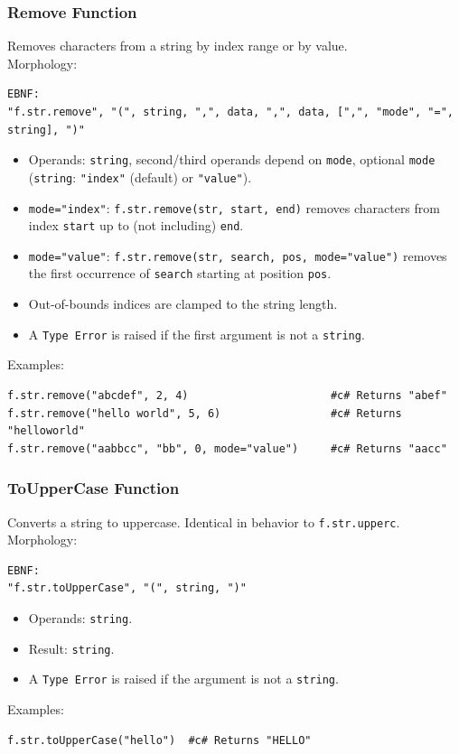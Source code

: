 \subsubsection{Remove Function}
Removes characters from a string by index range or by value. \\
Morphology:
\begin{verbatim}
EBNF:
"f.str.remove", "(", string, ",", data, ",", data, [",", "mode", "=", string], ")"
\end{verbatim}
\begin{itemize}
\item Operands: \texttt{string}, second/third operands depend on \texttt{mode}, optional \texttt{mode} (\texttt{string}: \texttt{"index"} (default) or \texttt{"value"}).
\item \texttt{mode="index"}: \texttt{f.str.remove(str, start, end)} removes characters from index \texttt{start} up to (not including) \texttt{end}.
\item \texttt{mode="value"}: \texttt{f.str.remove(str, search, pos, mode="value")} removes the first occurrence of \texttt{search} starting at position \texttt{pos}.
\item Out-of-bounds indices are clamped to the string length.
\item A \texttt{Type Error} is raised if the first argument is not a \texttt{string}.
\end{itemize}
Examples:
\begin{verbatim}
f.str.remove("abcdef", 2, 4)                      #c# Returns "abef"
f.str.remove("hello world", 5, 6)                 #c# Returns "helloworld"
f.str.remove("aabbcc", "bb", 0, mode="value")     #c# Returns "aacc"
\end{verbatim}

\subsubsection{ToUpperCase Function}
Converts a string to uppercase. Identical in behavior to \texttt{f.str.upperc}. \\
Morphology:
\begin{verbatim}
EBNF:
"f.str.toUpperCase", "(", string, ")"
\end{verbatim}
\begin{itemize}
\item Operands: \texttt{string}.
\item Result: \texttt{string}.
\item A \texttt{Type Error} is raised if the argument is not a \texttt{string}.
\end{itemize}
Examples:
\begin{verbatim}
f.str.toUpperCase("hello")  #c# Returns "HELLO"
\end{verbatim}

